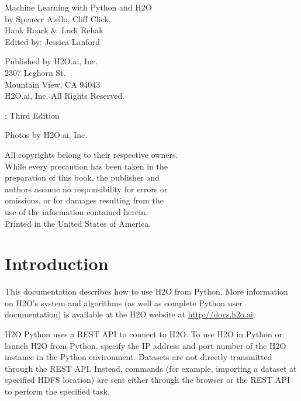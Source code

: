 \newpage
\restoregeometry

\null\vfill %

\thispagestyle{empty}%

{\raggedright 

Machine Learning with Python and H2O\\
  by Spencer Aiello, Cliff Click, \\ Hank Roark \&\  Ludi Rehak\\
Edited by: Jessica Lanford
\bigskip

Published by H2O.ai, Inc. \\
2307 Leghorn St. \\
Mountain View, CA 94043\\
\bigskip
\textcopyright \the\year \hspace{1pt} H2O.ai, Inc. All Rights Reserved. 
\bigskip

\monthname \hspace{1pt}  \the\year: Third Edition
\bigskip

Photos by \textcopyright H2O.ai, Inc.
\bigskip

All copyrights belong to their respective owners.\\
While every precaution has been taken in the\\
preparation of this book, the publisher and\\
authors assume no responsibility for errors or\\
omissions, or for damages resulting from the\\
use of the information contained herein.\\
\bigskip
Printed in the United States of America. 
}


\newpage
\thispagestyle{empty}%

\tableofcontents
\thispagestyle{empty}%

\newpage

\section{Introduction}

This documentation describes how to use H2O from Python. More information on H2O's system and algorithms
(as well as complete Python user documentation) is available at the H2O website at {\url{http://docs.h2o.ai}}.

H2O Python uses a REST API to connect to H2O. To use H2O in Python or launch H2O from Python, specify the IP address and port number of the H2O instance in the Python environment. Datasets are not directly transmitted
through the REST API. Instead, commands (for example, importing a dataset at specified HDFS location) are sent either through the browser or the REST API to perform the specified task.

